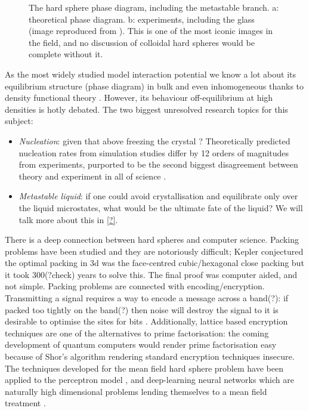 \documentclass[11pt]{report}
\begin{document}
\begin{figure}
  \missingfigure[figwidth=\linewidth]{}%
  \caption{The hard sphere phase diagram, including the metastable branch.
    a: theoretical phase diagram.
    b: experiments, including the glass (image reproduced from \cite{?}).
    This is one of the most iconic images in the field, and no discussion of colloidal hard spheres would be complete without it.}
\end{figure}

As the most widely studied model interaction potential we know a lot about its equilibrium structure (phase diagram) in bulk and even inhomogeneous thanks to density functional theory \cite{?,?,?}.
However, its behaviour off-equilibrium at high densities is hotly debated.
The two biggest unresolved research topics for this subject:
\begin{itemize}
\item \emph{Nucleation}: given that above freezing the crystal ? Theoretically predicted nucleation rates from simulation studies differ by 12 orders of magnitudes from experiments, purported to be the second biggest disagreement between theory and experiment in all of science \cite{?}.
\item \emph{Metastable liquid}: if one could avoid crystallisation and equilibrate only over the liquid microstates, what would be the ultimate fate of the liquid?
  We will talk more about this in \ref{?}.
\end{itemize}

There is a deep connection between hard spheres and computer science.
Packing problems have been studied \cite{Cohn,Conway,Sloane} and they are notoriously difficult; Kepler conjectured the optimal packing in 3d was the face-centred cubic/hexagonal close packing but it took 300(?check) years to solve this.
The final proof was computer aided, and not simple.
Packing problems are connected with encoding/encryption.
Transmitting a signal requires a way to encode a message across a band(?): if packed too tightly on the band(?) then noise will destroy the signal to it is desirable to optimise the sites for bits \cite{Cohn,?,?}.
Additionally, lattice based encryption techniques are one of the alternatives to prime factorisation: the coming development of quantum computers \cite{?,?} would render prime factorisation easy because of Shor's algorithm \cite{Shor?} rendering standard encryption techniques insecure.
The techniques developed for the mean field hard sphere problem have been applied to the perceptron model \cite{?}, and deep-learning neural networks which are naturally high dimensional problems lending themselves to a mean field treatment \cite{?}.
\end{document}
